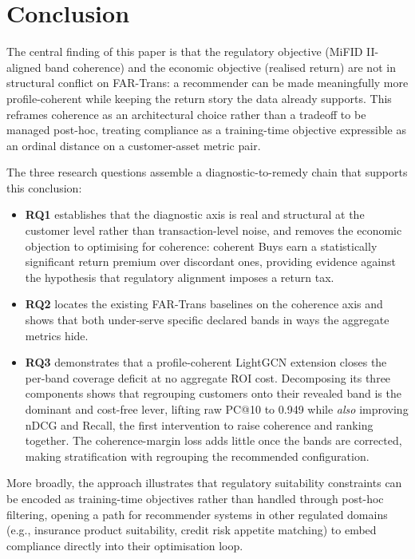 \section{Conclusion}
\label{sec:conclusion}

The central finding of this paper is that the regulatory objective (MiFID II-aligned band coherence) and the economic objective (realised return) are not in structural conflict on FAR-Trans: a recommender can be made meaningfully more profile-coherent while keeping the return story the data already supports. This reframes coherence as an architectural choice rather than a tradeoff to be managed post-hoc, treating compliance as a training-time objective expressible as an ordinal distance on a customer-asset metric pair.

The three research questions assemble a diagnostic-to-remedy chain that supports this conclusion:
\begin{itemize}
    \item \textbf{RQ1} establishes that the diagnostic axis is real and structural at the customer level rather than transaction-level noise, and removes the economic objection to optimising for coherence: coherent Buys earn a statistically significant return premium over discordant ones, providing evidence against the hypothesis that regulatory alignment imposes a return tax.
    \item \textbf{RQ2} locates the existing FAR-Trans baselines on the coherence axis and shows that both under-serve specific declared bands in ways the aggregate metrics hide.
    \item \textbf{RQ3} demonstrates that a profile-coherent LightGCN extension closes the per-band coverage deficit at no aggregate ROI cost. Decomposing its three components shows that regrouping customers onto their revealed band is the dominant and cost-free lever, lifting raw PC@10 to 0.949 while \emph{also} improving nDCG and Recall, the first intervention to raise coherence and ranking together. The coherence-margin loss adds little once the bands are corrected, making stratification with regrouping the recommended configuration.
\end{itemize}

More broadly, the approach illustrates that regulatory suitability constraints can be encoded as training-time objectives rather than handled through post-hoc filtering, opening a path for recommender systems in other regulated domains (e.g., insurance product suitability, credit risk appetite matching) to embed compliance directly into their optimisation loop.
